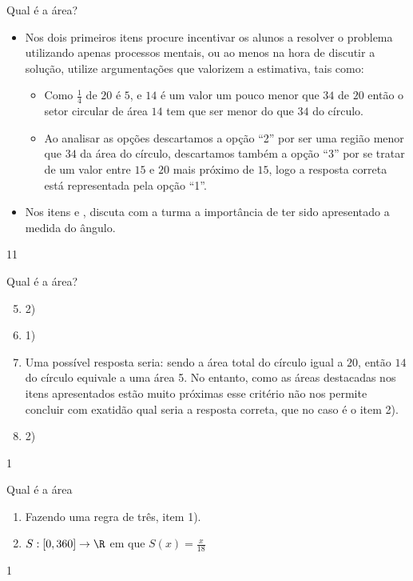 \begin{sugestions}{Qual é a área?}
{
\begin{itemize}
\item Nos dois primeiros itens procure incentivar os alunos a resolver o problema utilizando apenas processos mentais, ou ao menos na hora de discutir a solução, utilize argumentações que valorizem a estimativa, tais como:

\begin{itemize}
\item Como $\frac{1}{4}$ de $20$ é $5$, e $14$ é um valor um pouco menor que $34$ de $20$ então o setor circular de área $14$ tem que ser menor do que $34$ do círculo.

\item Ao analisar as opções descartamos a opção “2” por ser uma região menor que $34$ da área do círculo, descartamos também a opção “3” por se tratar de um valor entre $15$ e $20$ mais próximo de $15$, logo a resposta correta está representada pela opção “1”.
\end{itemize}

\item Nos itens  e , discuta com a turma a importância de ter sido apresentado a medida do ângulo.
\end{itemize}
}{1}{1}
\end{sugestions}
\begin{answer}{Qual é a área?}
{
\begin{enumerate}\setcounter{enumi}{4}
\item 2)
\item 1)
\item Uma possível resposta seria: sendo a área total do círculo igual a $20$, então $14$ do círculo equivale a uma área 5. No entanto, como as áreas destacadas nos itens apresentados estão muito próximas esse critério não nos permite concluir com exatidão qual seria a resposta correta, que no caso é o item 2).
\item 2)
\end{enumerate}
}{1}
\end{answer}
\clearmargin
\begin{answer}{Qual é a área}
{
  \begin{enumerate}
  \item Fazendo uma regra de três, item 1).
  \item $S:[0,360]\rightarrow\R$ em que $S(x)=\frac{x}{18}$
  \end{enumerate}
}{1}
\end{answer}


